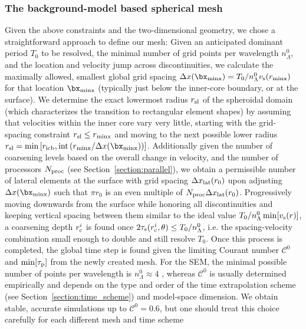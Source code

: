 \subsubsection{The background-model based spherical mesh}
%
Given the above constraints and the two-dimensional geometry, 
we chose a straightforward approach to define our mesh: 
Given an anticipated dominant period $T_0$ 
to be resolved, the minimal number of grid points per wavelength $n^0_\Lambda$, 
and the location and velocity jump across discontinuities,
we calculate the maximally allowed, smallest global grid spacing  
$\Delta x(\bx_{\rm minx})=T_0/n^0_\Lambda v_{\rm s}(r_{\rm minx})$  for that location 
$\bx_{\rm minx}$ (typically just below the inner-core boundary, or at the surface). 
We determine the exact lowermost radius $r_{\rm sl}$ of the spheroidal domain 
(which characterizes the transition to rectangular element shapes)
by assuming that velocities within the inner core vary very little, starting with 
the grid-spacing constraint $r_{\rm sl}\le r_{\rm minx}$ and moving to 
the next possible lower radius
$r_{\rm sl}=\min\left[r_{\rm icb},{\rm int}\left(r_{\rm minx}/\Delta x(\bx_{\rm minx})\right)\right]$.
Additionally given the number of coarsening levels based 
on the overall change in velocity, and the number of processors $N_{\rm proc}$
(see Section~\ref{section:parallel}), we obtain a permissible number of lateral 
elements at the surface with grid spacing $\Delta x_{\rm lat}(r_0)$ 
upon adjusting $\Delta x(\bx_{\rm minx})$ such that 
$\pi r_0$ is an even multiple of $N_{\rm proc} \Delta x_{\rm lat}(r_0)$.
Progressively moving downwards from the surface while honoring all 
discontinuities and keeping vertical spacing between them similar to 
the ideal value $T_0/n^0_\Lambda \min[v_{\rm s}(r)]$, a coarsening depth 
$\textstyle{r_{\rm c}^i}$ is 
found once $\textstyle{2\tau_{\rm s}(r_{\rm c}^i,\theta)\le T_0/n^0_\Lambda}$, 
i.e. the spacing-velocity combination small enough to double and still resolve $T_0$. 
Once this process is completed, the global time step is found given the limiting 
Courant number ${\mathcal C}^0$ and $\min[\tau_{\rm p}]$ from the newly 
created mesh.
For the SEM, the minimal possible number of points per wavelength is 
$n_\Lambda^0\approx4$ \citep[e.g.][]{Ampuero+:07}, whereas ${\mathcal C}^0$ is 
usually determined empirically and depends on the type and 
order of the time extrapolation scheme (see Section~\ref{section:time_scheme})
and model-space dimension.
We obtain stable, accurate simulations up to ${\mathcal C}^0=0.6$, but one should 
treat this choice carefully for each different mesh and time scheme 
